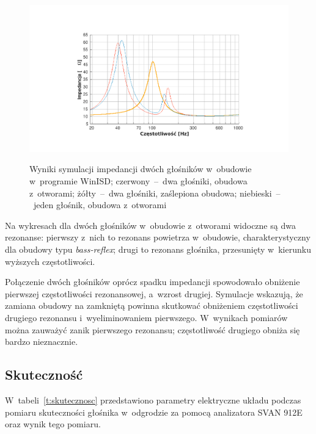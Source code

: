\documentclass[12pt]{oska}
\begin{document}
	\begin{figure}[!ht]
		\centering
		\includegraphics[width=.8\textwidth,trim={5.1cm 1.5cm 4.7cm 3cm},clip]{winisd_osie.pdf}\\
		\setlength{\unitlength}{1mm}
		\caption{Wyniki symulacji impedancji dwóch głośników w~obudowie w~programie WinISD; \color{BrickRed}czerwony\color{Black}~--~dwa głośniki, obudowa z~otworami; \color{Dandelion}żółty\color{Black}~--~dwa głośniki, zaślepiona obudowa; \color{RoyalBlue}niebieski\color{Black}~--~jeden głośnik, obudowa z~otworami}
		\label{r:winisd}
	\end{figure}
	
	Na wykresach dla dwóch głośników w~obudowie z~otworami widoczne są dwa rezonanse: pierwszy z~nich to rezonans powietrza w~obudowie, charakterystyczny dla obudowy typu \textit{bass-reflex}; drugi to rezonans głośnika, przesunięty w~kierunku wyższych częstotliwości.
	
	Połączenie dwóch głośników oprócz spadku impedancji spowodowało obniżenie pierwszej częstotliwości rezonansowej, a~wzrost drugiej.  Symulacje wskazują, że zamiana obudowy na zamkniętą powinna skutkować obniżeniem częstotliwości drugiego rezonansu i~wyeliminowaniem pierwszego. W~wynikach pomiarów można zauważyć zanik pierwszego rezonansu; częstotliwość drugiego obniża się bardzo nieznacznie.
	
	
	\subsection{Skuteczność}
	
	W~tabeli~\ref{t:skutecznosc} przedstawiono parametry elektryczne układu podczas pomiaru skuteczności głośnika w~odgrodzie za pomocą analizatora SVAN 912E oraz wynik tego pomiaru.
	
\end{document}
